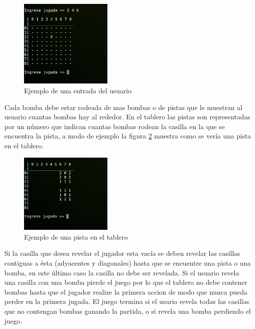 \documentclass[letterpaper,12pt]{report}
\begin{document}
\begin{figure}[H]
    \centering
    \includegraphics[width=0.4\textwidth]{ejemploEntrada.png}
    \caption{Ejemplo de una entrada del usuario}
    \label{fig:ejemploEntrada}
\end{figure}

Cada bomba debe estar rodeada de mas bombas o de pistas que le muestran al usuario cuantas bombas hay al rededor. En el tablero las pistas son representadas por un número que indican cuantas bombas rodean la casilla en la que se encuentra la pista, a modo de ejemplo la figura \ref{fig:ejemploPista} muestra como se vería una pista en el tablero.

\begin{figure}[H]
    \centering
    \includegraphics[width=0.4\textwidth]{ejemploPista.png}
    \caption{Ejemplo de una pista en el tablero}
    \label{fig:ejemploPista}
\end{figure}

Si la casilla que desea revelar el jugador esta vacía se deben revelar las casillas contiguas a ésta (adyacentes y diagonales) hasta que se encuentre una pista o una bomba, en este último caso la casilla no debe ser revelada. Si el usuario revela una casilla con una bomba pierde el juego por lo que el tablero no debe contener bombas hasta que el jugador realize la primera accion de modo que nunca pueda perder en la primera jugada. El juego termina si el usario revela todas las casillas que no contengan bombas ganando la partida, o si revela una bomba perdiendo el juego.
\end{document}
